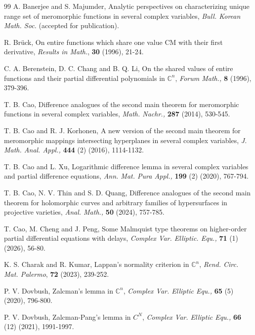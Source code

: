 \documentclass[11pt, reqno]{amsart}
\numberwithin{equation}{section}
\begin{document}
\begin{thebibliography}{99}
 {\sc A. Banerjee} and {\sc S. Majumder}, Analytic perspectives on characterizing unique range set of meromorphic functions in several complex variables, \textit{Bull. Korean Math. Soc.} (accepted for publication).

 {\sc R. Br\"{u}ck}, On entire functions which share one value CM with their first derivative, \textit{Results in Math.}, \textbf{30} (1996), 21-24.

 {\sc C. A. Berenstein}, {\sc D. C. Chang} and {\sc B. Q. Li}, On the shared values of entire functions and their partial differential polynomials in $\mathbb{C}^n$, \textit{Forum Math.,} \textbf{8} (1996), 379-396.

 {\sc T. B. Cao}, Difference analogues of the second main theorem for meromorphic functions in several complex variables, \textit{Math. Nachr.,} \textbf{287} (2014), 530-545.

 {\sc T. B. Cao} and {\sc R. J. Korhonen}, A new version of the second main theorem for meromorphic mappings intersecting hyperplanes in several complex variables, \textit{J. Math. Anal. Appl.,} \textbf{444} (2) (2016), 1114-1132.

 {\sc T. B. Cao} and {\sc L. Xu}, Logarithmic difference lemma in several complex variables and partial difference equations, \textit{Ann. Mat. Pura Appl.,} \textbf{199} (2) (2020), 767-794.

 {\sc T. B. Cao}, {\sc N. V. Thin} and {\sc S. D. Quang}, Difference analogues of the second main theorem for holomorphic curves and arbitrary families of hypersurfaces in projective varieties, \textit{Anal. Math.,} \textbf{50} (2024), 757-785.

 {\sc T. Cao}, {\sc M. Cheng} and {\sc J. Peng}, Some Malmquist type theorems on higher-order partial differential equations with delays, \textit{Complex Var. Elliptic. Equ.,} \textbf{71} (1) (2026), 56-80.

 {\sc K. S. Charak} and {\sc R. Kumar}, Lappan's normality criterion in $\mathbb{C}^n$, \textit{Rend. Circ. Mat. Palermo}, \textbf{72} (2023), 239-252.

 {\sc P. V. Dovbush}, Zalcman's lemma in $\mathbb{C}^n$, \textit{Complex Var. Elliptic Equ.,} \textbf{65} (5) (2020), 796-800.

 {\sc P. V. Dovbush}, Zalcman-Pang's lemma in $C^N$, \textit{Complex Var. Elliptic Equ.,} \textbf{66} (12) (2021), 1991-1997.


\end{thebibliography}
\end{document}
